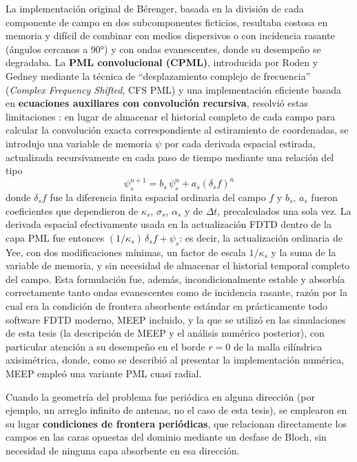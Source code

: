La implementación original de Bérenger, basada en la división de cada componente de campo en dos subcomponentes ficticios, resultaba costosa en memoria y difícil de combinar con medios dispersivos o con incidencia rasante (ángulos cercanos a 90°) y con ondas evanescentes, donde su desempeño se degradaba. La \textbf{PML convolucional (CPML)}, introducida por Roden y Gedney mediante la técnica de ``desplazamiento complejo de frecuencia'' (\textit{Complex Frequency Shifted}, CFS PML) y una implementación eficiente basada en \textbf{ecuaciones auxiliares con convolución recursiva}, resolvió estas limitaciones \cite{Roden2000}: en lugar de almacenar el historial completo de cada campo para calcular la convolución exacta correspondiente al estiramiento de coordenadas, se introdujo una variable de memoria $\psi$ por cada derivada espacial estirada, actualizada recursivamente en cada paso de tiempo mediante una relación del tipo
\begin{equation}
    \psi_s^{n+1} = b_s\, \psi_s^{n} + a_s\left(\delta_s f\right)^n
\end{equation}
donde $\delta_s f$ fue la diferencia finita espacial ordinaria del campo $f$ y $b_s$, $a_s$ fueron coeficientes que dependieron de $\kappa_s$, $\sigma_s$, $\alpha_s$ y de $\Delta t$, precalculados una sola vez. La derivada espacial efectivamente usada en la actualización FDTD dentro de la capa PML fue entonces $(1/\kappa_s)\, \delta_s f + \psi_s$: es decir, la actualización ordinaria de Yee, con dos modificaciones mínimas, un factor de escala $1/\kappa_s$ y la suma de la variable de memoria, y sin necesidad de almacenar el historial temporal completo del campo. Esta formulación fue, además, incondicionalmente estable y absorbía correctamente tanto ondas evanescentes como de incidencia rasante, razón por la cual era la condición de frontera absorbente estándar en prácticamente todo software FDTD moderno, MEEP incluido, y la que se utilizó en las simulaciones de esta tesis (la descripción de MEEP y el análisis numérico posterior), con particular atención a su desempeño en el borde $r=0$ de la malla cilíndrica axisimétrica, donde, como se describió al presentar la implementación numérica, MEEP empleó una variante PML cuasi radial.

Cuando la geometría del problema fue periódica en alguna dirección (por ejemplo, un arreglo infinito de antenas, no el caso de esta tesis), se emplearon en su lugar \textbf{condiciones de frontera periódicas}, que relacionan directamente los campos en las caras opuestas del dominio mediante un desfase de Bloch, sin necesidad de ninguna capa absorbente en esa dirección.

